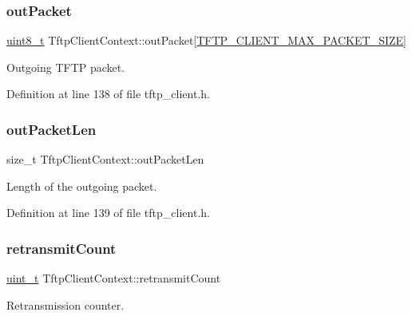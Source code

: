 \subsubsection{\texorpdfstring{out\+Packet}{outPacket}}
{\footnotesize\ttfamily \hyperlink{stdint_8h_aba7bc1797add20fe3efdf37ced1182c5}{uint8\+\_\+t} Tftp\+Client\+Context\+::out\+Packet\mbox{[}\hyperlink{tftp__client_8h_a2afd441851cee2c32c2a02ea2e24c9e0}{T\+F\+T\+P\+\_\+\+C\+L\+I\+E\+N\+T\+\_\+\+M\+A\+X\+\_\+\+P\+A\+C\+K\+E\+T\+\_\+\+S\+I\+ZE}\mbox{]}}



Outgoing T\+F\+TP packet. 



Definition at line 138 of file tftp\+\_\+client.\+h.

\mbox{\label{structTftpClientContext_a007702b449446fd7e376c1a420bd518d}} 
\subsubsection{\texorpdfstring{out\+Packet\+Len}{outPacketLen}}
{\footnotesize\ttfamily size\+\_\+t Tftp\+Client\+Context\+::out\+Packet\+Len}



Length of the outgoing packet. 



Definition at line 139 of file tftp\+\_\+client.\+h.

\mbox{\label{structTftpClientContext_a553a66049549f947eb23fbe419dea373}} 
\subsubsection{\texorpdfstring{retransmit\+Count}{retransmitCount}}
{\footnotesize\ttfamily \hyperlink{compiler__port_8h_a12a1e9b3ce141648783a82445d02b58d}{uint\+\_\+t} Tftp\+Client\+Context\+::retransmit\+Count}



Retransmission counter. 



